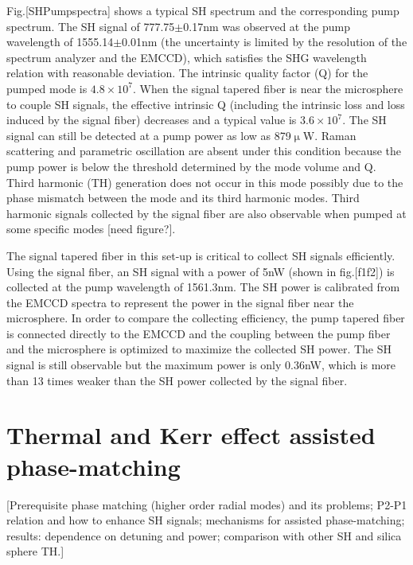 \documentclass[a4paper,12pt,hyperref]{article}
\begin{document}
Fig.[SHPumpspectra] shows a typical SH spectrum and the corresponding pump spectrum. The SH signal of 777.75$\pm$0.17nm was observed at the pump wavelength of 1555.14$\pm$0.01nm (the uncertainty is limited by the resolution of the spectrum analyzer and the EMCCD), which satisfies the SHG wavelength relation with reasonable deviation. The intrinsic quality factor (Q) for the pumped mode is $4.8\times10^7$. When the signal tapered fiber is near the microsphere to couple SH signals, the effective intrinsic Q (including the intrinsic loss and loss induced by the signal fiber) decreases and a typical value is $3.6\times 10^7$. The SH signal can still be detected at a pump power as low as 879$\upmu $W. Raman scattering and parametric oscillation are absent under this condition because the pump power is below the threshold determined by the mode volume and Q\cite{spillane2002ultralow, kippenberg2004kerr}. Third harmonic (TH) generation does not occur in this mode possibly due to the phase mismatch between the mode and its third harmonic modes\cite{carmon2007visible}. Third harmonic signals  collected by the signal fiber are also observable when pumped at some specific modes [need figure?]. 

The signal tapered fiber in this set-up is critical to collect SH signals efficiently. Using the signal fiber, an SH signal with a power of 5nW (shown in fig.[f1f2]) is collected at the pump wavelength of 1561.3nm. The SH power is calibrated from the EMCCD spectra to represent the power in the signal fiber near the microsphere. In order to compare the collecting efficiency, the pump tapered fiber is connected directly to the EMCCD and the coupling between the pump fiber and the microsphere is optimized to maximize the collected SH power. The SH signal is still observable but the maximum power is only 0.36nW, which is more than 13 times weaker than the SH power collected by the signal fiber.


\section{Thermal and Kerr effect assisted phase-matching}
[Prerequisite phase matching (higher order radial modes) and its problems; P2-P1 relation and how to enhance SH signals; mechanisms for assisted phase-matching; results: dependence on detuning and power; comparison with other SH and silica sphere TH.]
\end{document}
